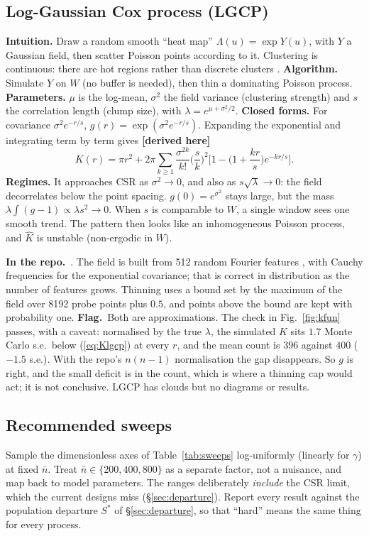 \documentclass[10pt,a4paper]{article}
\newcommand{\code}[1]{\texttt{\detokenize{#1}}}
\newcommand{\repo}{\par\textbf{In the repo.}\ }
\newcommand{\flag}{\textcolor{red!65!black}{\textbf{Flag.}}\ }
\newcommand{\derived}{\textcolor{green!45!black}{\textbf{[derived here]}}}
\newcommand{\nbar}{\bar n}
\begin{document}
\subsection{Log-Gaussian Cox process (LGCP)}\label{sec:lgcp}
\textbf{Intuition.} Draw a random smooth ``heat map'' $\Lambda(u)=\exp Y(u)$, with $Y$ a Gaussian field, then scatter Poisson points according to it. Clustering is continuous: there are hot regions rather than discrete clusters \citep{Moller1998}.
\textbf{Algorithm.} Simulate $Y$ on $W$ (no buffer is needed), then thin a dominating Poisson process.
\textbf{Parameters.} $\mu$ is the log-mean, $\sigma^2$ the field variance (clustering strength) and $s$ the correlation length (clump size), with $\lambda=e^{\mu+\sigma^2/2}$.
\textbf{Closed forms.} For covariance $\sigma^2e^{-r/s}$, $g(r)=\exp(\sigma^2e^{-r/s})$. Expanding the exponential and integrating term by term gives \derived{}
\begin{equation}
K(r)=\pi r^2+2\pi\sum_{k\ge1}\frac{\sigma^{2k}}{k!}\Big(\frac sk\Big)^2\Big[1-\Big(1+\frac{kr}{s}\Big)e^{-kr/s}\Big].
\label{eq:Klgcp}
\end{equation}
\textbf{Regimes.} It approaches CSR as $\sigma^2\to0$, and also as $s\sqrt\lambda\to0$: the field decorrelates below the point spacing. $g(0)=e^{\sigma^2}$ stays large, but the mass $\lambda\int(g-1)\propto\lambda s^2\to0$. When $s$ is comparable to $W$, a single window sees one smooth trend. The pattern then looks like an inhomogeneous Poisson process, and $\hat K$ is unstable (non-ergodic in $W$).
\repo \code{cox.py:29-92,138-158}. The field is built from 512 random Fourier features \citep{RahimiRecht2007}, with Cauchy frequencies for the exponential covariance; that is correct in distribution as the number of features grows. Thinning uses a bound set by the maximum of the field over 8192 probe points plus $0.5$, and points above the bound are kept with probability one. \flag Both are approximations. The check in Fig.~\ref{fig:kfun} passes, with a caveat: normalised by the true $\lambda$, the simulated $K$ sits $1.7$ Monte Carlo s.e.\ below (\ref{eq:Klgcp}) at every $r$, and the mean count is $396$ against $400$ ($-1.5$ s.e.). With the repo's $n(n-1)$ normalisation the gap disappears. So $g$ is right, and the small deficit is in the count, which is where a thinning cap would act; it is not conclusive. LGCP has clouds but no diagrams or results.

\subsection{Recommended sweeps}\label{sec:sweeps}
Sample the dimensionless axes of Table~\ref{tab:sweeps} log-uniformly (linearly for $\gamma$) at fixed $\nbar$. Treat $\nbar\in\{200,400,800\}$ as a separate factor, not a nuisance, and map back to model parameters. The ranges deliberately \emph{include} the CSR limit, which the current designs miss (\S\ref{sec:departure}). Report every result against the population departure $S^\ast$ of \S\ref{sec:departure}, so that ``hard'' means the same thing for every process.
\end{document}
